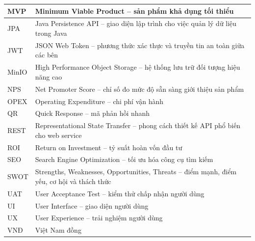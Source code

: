 \begin{longtable}{|L{3cm}|L{11cm}|}
\hline
MVP & Minimum Viable Product -- sản phẩm khả dụng tối thiểu \\
\hline
JPA & Java Persistence API -- giao diện lập trình cho việc quản lý dữ liệu trong Java \\
\hline
JWT & JSON Web Token -- phương thức xác thực và truyền tin an toàn giữa các bên \\
\hline
MinIO & High Performance Object Storage -- hệ thống lưu trữ đối tượng hiệu năng cao \\
\hline
NPS & Net Promoter Score -- chỉ số đo mức độ sẵn sàng giới thiệu sản phẩm \\
\hline
OPEX & Operating Expenditure -- chi phí vận hành \\
\hline
QR & Quick Response -- mã phản hồi nhanh \\
\hline
REST & Representational State Transfer -- phong cách thiết kế API phổ biến cho web service \\
\hline
ROI & Return on Investment -- tỷ suất hoàn vốn đầu tư \\
\hline
SEO & Search Engine Optimization -- tối ưu hóa công cụ tìm kiếm \\
\hline
SWOT & Strengths, Weaknesses, Opportunities, Threats -- điểm mạnh, điểm yếu, cơ hội và thách thức \\
\hline
UAT & User Acceptance Test -- kiểm thử chấp nhận người dùng \\
\hline
UI & User Interface -- giao diện người dùng \\
\hline
UX & User Experience -- trải nghiệm người dùng \\
\hline
VNĐ & Việt Nam đồng \\
\hline
\end{longtable}
